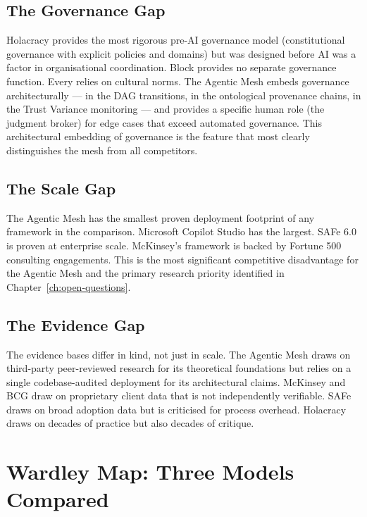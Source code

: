 \subsection{The Governance Gap}

Holacracy provides the most rigorous pre-AI governance model (constitutional governance with explicit policies and domains) but was designed before AI was a factor in organisational coordination. Block provides no separate governance function. Every relies on cultural norms. The Agentic Mesh embeds governance architecturally --- in the DAG transitions, in the ontological provenance chains, in the Trust Variance monitoring --- and provides a specific human role (the judgment broker) for edge cases that exceed automated governance. This architectural embedding of governance is the feature that most clearly distinguishes the mesh from all competitors.

\subsection{The Scale Gap}

The Agentic Mesh has the smallest proven deployment footprint of any framework in the comparison. Microsoft Copilot Studio has the largest. SAFe 6.0 is proven at enterprise scale. McKinsey's framework is backed by Fortune 500 consulting engagements. This is the most significant competitive disadvantage for the Agentic Mesh and the primary research priority identified in Chapter~\ref{ch:open-questions}.

\subsection{The Evidence Gap}

The evidence bases differ in kind, not just in scale. The Agentic Mesh draws on third-party peer-reviewed research \parencite{DellAcqua2026, Randazzo2024, Acemoglu2025} for its theoretical foundations but relies on a single codebase-audited deployment for its architectural claims. McKinsey and BCG draw on proprietary client data that is not independently verifiable. SAFe draws on broad adoption data but is criticised for process overhead. Holacracy draws on decades of practice but also decades of critique.

\section{Wardley Map: Three Models Compared}

